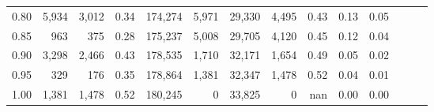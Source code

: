 \begin{tabular}{rrrrrrrrrrrrrr}
0.80 &   5,934 &  3,012 &  0.34 &  174,274 &    5,971 &  29,330 &   4,495 &  0.43 &  0.13 &      0.05 \\
0.85 &     963 &    375 &  0.28 &  175,237 &    5,008 &  29,705 &   4,120 &  0.45 &  0.12 &      0.04 \\
0.90 &   3,298 &  2,466 &  0.43 &  178,535 &    1,710 &  32,171 &   1,654 &  0.49 &  0.05 &      0.02 \\
0.95 &     329 &    176 &  0.35 &  178,864 &    1,381 &  32,347 &   1,478 &  0.52 &  0.04 &      0.01 \\
1.00 &   1,381 &  1,478 &  0.52 &  180,245 &        0 &  33,825 &       0 &   nan &  0.00 &      0.00 \\
\bottomrule
\end{tabular}
